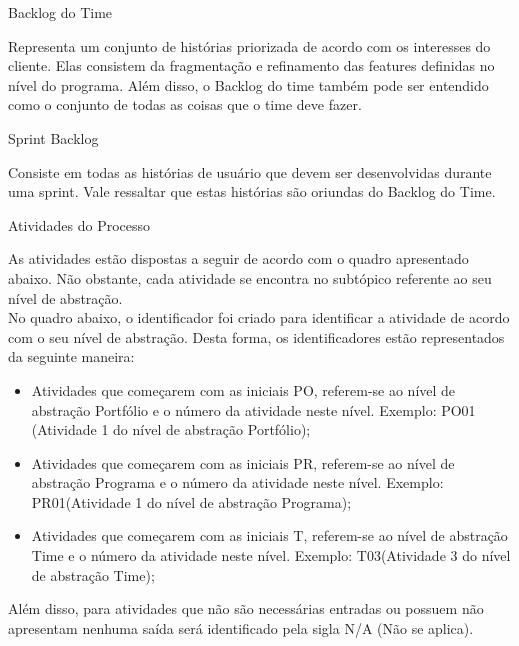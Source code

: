 {{
	\large{Backlog do Time \\}

	\tab Representa um conjunto de histórias priorizada de acordo com os interesses do cliente. Elas consistem da fragmentação e refinamento das features definidas no nível do programa. Além disso, o Backlog do time também pode ser entendido como o conjunto de todas as coisas que o time deve fazer. \\
}

{
	\large{Sprint Backlog\\}

	\tab Consiste em todas as histórias de usuário que devem ser desenvolvidas durante uma sprint. Vale ressaltar que estas histórias são oriundas do Backlog do Time. \\
}

{

	\large{Atividades do Processo \\}

	\tab As atividades  estão dispostas a seguir de acordo com o quadro apresentado abaixo. Não obstante, cada atividade se encontra no subtópico referente ao seu nível de abstração. \\
	\tab No quadro abaixo, o identificador foi criado para identificar a atividade de acordo com o seu nível de abstração. Desta forma, os identificadores estão representados da seguinte maneira: \\

	\begin{itemize}
		\item Atividades que começarem com as iniciais PO, referem-se ao nível de abstração Portfólio e o número da atividade neste nível. Exemplo: PO01 (Atividade 1 do nível de abstração Portfólio);\\
		\item Atividades que começarem com as iniciais PR, referem-se ao nível de abstração Programa e o número da atividade neste nível. Exemplo: PR01(Atividade 1 do nível de abstração Programa);\\
		\item Atividades que começarem com as iniciais T, referem-se ao nível de abstração Time e o número da atividade neste nível. Exemplo: T03(Atividade 3 do nível de abstração Time); \\
	\end{itemize}

	\tab Além disso, para atividades que não são necessárias entradas ou possuem não apresentam nenhuma saída será identificado pela sigla N/A (Não se aplica).\\

}}
